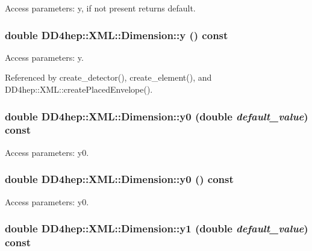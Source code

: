 Access parameters: y, if not present returns default. \hypertarget{struct_d_d4hep_1_1_x_m_l_1_1_dimension_a882936e0dde2b0466f37f96c637177a0}{
\subsubsection[{y}]{\setlength{\rightskip}{0pt plus 5cm}double DD4hep::XML::Dimension::y () const}}
\label{struct_d_d4hep_1_1_x_m_l_1_1_dimension_a882936e0dde2b0466f37f96c637177a0}


Access parameters: y. 

Referenced by create\_\-detector(), create\_\-element(), and DD4hep::XML::createPlacedEnvelope().\hypertarget{struct_d_d4hep_1_1_x_m_l_1_1_dimension_a90b3314f990f3f5a17fa678c37f649a5}{
\subsubsection[{y0}]{\setlength{\rightskip}{0pt plus 5cm}double DD4hep::XML::Dimension::y0 (double {\em default\_\-value}) const}}
\label{struct_d_d4hep_1_1_x_m_l_1_1_dimension_a90b3314f990f3f5a17fa678c37f649a5}


Access parameters: y0. \hypertarget{struct_d_d4hep_1_1_x_m_l_1_1_dimension_a99ed1d277f52c51439673394d6002877}{
\subsubsection[{y0}]{\setlength{\rightskip}{0pt plus 5cm}double DD4hep::XML::Dimension::y0 () const}}
\label{struct_d_d4hep_1_1_x_m_l_1_1_dimension_a99ed1d277f52c51439673394d6002877}


Access parameters: y0. \hypertarget{struct_d_d4hep_1_1_x_m_l_1_1_dimension_a75861ed658980402c4d22308a4e173b4}{
\subsubsection[{y1}]{\setlength{\rightskip}{0pt plus 5cm}double DD4hep::XML::Dimension::y1 (double {\em default\_\-value}) const}}
\label{struct_d_d4hep_1_1_x_m_l_1_1_dimension_a75861ed658980402c4d22308a4e173b4}



